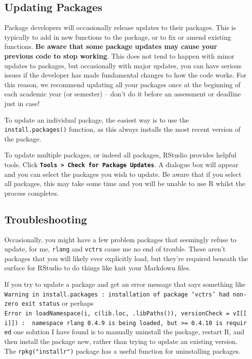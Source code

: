 \documentclass[
  oneside]{book}
\begin{document}
\hypertarget{updating-packages}{%
\subsection{Updating Packages}\label{updating-packages}}

Package developers will occasionally release updates to their packages. This is typically to add in new functions to the package, or to fix or amend existing functions. \textbf{Be aware that some package updates may cause your previous code to stop working}. This does not tend to happen with minor updates to packages, but occasionally with major updates, you can have serious issues if the developer has made fundamental changes to how the code works. For this reason, we recommend updating all your packages once at the beginning of each academic year (or semester) -- don't do it before an assessment or deadline just in case!

To update an individual package, the easiest way is to use the \texttt{install.packages()} function, as this always installs the most recent version of the package.

To update multiple packages, or indeed all packages, RStudio provides helpful tools. Click \textbf{\texttt{Tools\ \textgreater{}\ Check\ for\ Package\ Updates}}. A dialogue box will appear and you can select the packages you wish to update. Be aware that if you select all packages, this may take some time and you will be unable to use R whilst the process completes.

\hypertarget{troubleshooting-1}{%
\subsection{Troubleshooting}\label{troubleshooting-1}}

Occasionally, you might have a few problem packages that seemingly refuse to update, for me, \texttt{rlang} and \texttt{vctrs} cause me no end of trouble. These aren't packages that you will likely ever explicitly load, but they're required beneath the surface for RStudio to do things like knit your Markdown files.

If you try to update a package and get an error message that says something like \texttt{Warning\ in\ install.packages\ :\ installation\ of\ package\ ‘vctrs’\ had\ non-zero\ exit\ status} or perhaps \texttt{Error\ in\ loadNamespace(i,\ c(lib.loc,\ .libPaths()),\ versionCheck\ =\ vI{[}{[}i{]}{]})\ :\ \ namespace\ \textquotesingle{}rlang\textquotesingle{}\ 0.4.9\ is\ being\ loaded,\ but\ \textgreater{}=\ 0.4.10\ is\ required} one solution I have found is to manually uninstall the package, restart R, and then install the package new, rather than trying to update an existing version. The \texttt{rpkg("installr")} package has a useful function for uninstalling packages.
\end{document}
